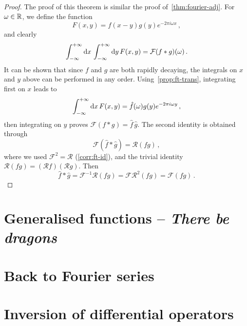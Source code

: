 \begin{proof}
  The proof of this theorem is similar the proof of~\cref{thm:fourier-adj}. For
  $\omega\in\mathbb{R}$, we define the function
  \begin{equation}
    F(x,y)=f(x-y)g(y)e^{-2\pi i \omega x}\,,
  \end{equation}
  and clearly
  \begin{equation}
    \int_{-\infty}^{+\infty}\mathrm{d}{x}\,\int_{-\infty}^{+\infty}\mathrm{d}{y}\,F(x,y)=\mathcal{F}(f\ast g)(\omega)\,.
  \end{equation}
  It can be shown that since $f$ and $g$ are both rapidly decaying, the integrals on $x$
  and $y$ above can be performed in any order. Using~\cref{prop:ft-trans}, integrating
  first on $x$ leads to
  \begin{equation}
    \int_{-\infty}^{+\infty}\mathrm{d}{x}\,F(x,y)=\hat{f}(\omega)g(y)e^{-2\pi i\omega y}\,,
  \end{equation}
  then integrating on $y$ proves $\mathcal{F}(f\ast g)=\hat{f}\,\hat{g}$. The second
  identity is obtained through
  \begin{equation}
    \mathcal{F}(\hat{f}\ast\hat{g})=\mathcal{R}(fg)\,,
  \end{equation}
  where we used $\mathcal{F}^2=\mathcal{R}$ (\cref{corr:ft-id}), and the trivial identity
  $\mathcal{R}(fg)=(\mathcal{R}f)(\mathcal{R}g)$. Then
  \begin{equation}
    \hat{f}\ast\hat{g}=\mathcal{F}^{-1}\mathcal{R}(fg)=\mathcal{F}\mathcal{R}^2(fg)
    =\mathcal{F}(fg)\,.
  \end{equation}
\end{proof}
\section{Generalised functions -- \textit{There be dragons}}
\section{Back to Fourier series}
\section{Inversion of differential operators}
